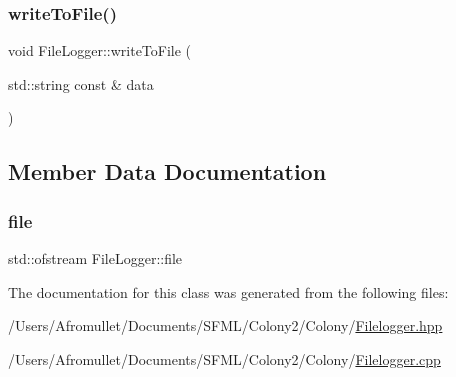 \subsubsection{\texorpdfstring{write\+To\+File()}{writeToFile()}}
{\footnotesize\ttfamily void File\+Logger\+::write\+To\+File (\begin{DoxyParamCaption}\item[{std\+::string const \&}]{data }\end{DoxyParamCaption})}



\subsection{Member Data Documentation}
\mbox{\label{class_file_logger_aa1761aefebbc2a2120600da98b758e88}} 
\subsubsection{\texorpdfstring{file}{file}}
{\footnotesize\ttfamily std\+::ofstream File\+Logger\+::file\hspace{0.3cm}{\ttfamily [private]}}



The documentation for this class was generated from the following files\+:\begin{DoxyCompactItemize}
\item 
/\+Users/\+Afromullet/\+Documents/\+S\+F\+M\+L/\+Colony2/\+Colony/\mbox{\hyperlink{_filelogger_8hpp}{Filelogger.\+hpp}}\item 
/\+Users/\+Afromullet/\+Documents/\+S\+F\+M\+L/\+Colony2/\+Colony/\mbox{\hyperlink{_filelogger_8cpp}{Filelogger.\+cpp}}\end{DoxyCompactItemize}
